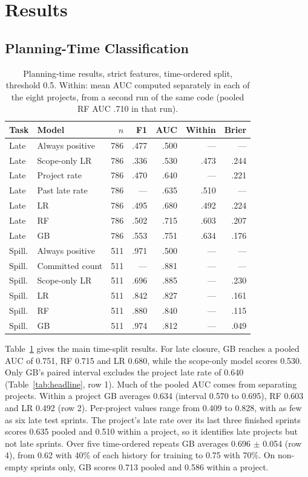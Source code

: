 \documentclass[conference]{IEEEtran}
\begin{document}
\section{Results}

\subsection{Planning-Time Classification}
\label{sec:plan}

\begin{table}[!t]
\centering\scriptsize
\caption{Planning-time results, strict features, time-ordered split, threshold 0.5. Within: mean AUC computed separately in each of the eight projects, from a second run of the same code (pooled RF AUC .710 in that run).}
\label{tab:main}
\setlength{\tabcolsep}{3pt}
\begin{tabular}{llrrrrr}
\hline
Task & Model & $n$ & F1 & AUC & Within & Brier\\
\hline
Late & Always positive & 786 & .477 & .500 & --- & ---\\
Late & Scope-only LR & 786 & .336 & .530 & .473 & .244\\
Late & Project rate & 786 & .470 & .640 & --- & .221\\
Late & Past late rate & 786 & --- & .635 & .510 & ---\\
Late & LR & 786 & .495 & .680 & .492 & .224\\
Late & RF & 786 & .502 & .715 & .603 & .207\\
Late & GB & 786 & .553 & .751 & .634 & .176\\
\hline
Spill. & Always positive & 511 & .971 & .500 & --- & ---\\
Spill. & Committed count & 511 & --- & .881 & --- & ---\\
Spill. & Scope-only LR & 511 & .696 & .885 & --- & .230\\
Spill. & LR & 511 & .842 & .827 & --- & .161\\
Spill. & RF & 511 & .880 & .840 & --- & .115\\
Spill. & GB & 511 & .974 & .812 & --- & .049\\
\hline
\end{tabular}
\end{table}

Table~\ref{tab:main} gives the main time-split results. For late closure, GB reaches a pooled AUC of 0.751, RF 0.715 and LR 0.680, while the scope-only model scores 0.530. Only GB's paired interval excludes the project late rate of 0.640 (Table~\ref{tab:headline}, row 1). Much of the pooled AUC comes from separating projects. Within a project GB averages 0.634 (interval 0.570 to 0.695), RF 0.603 and LR 0.492 (row 2). Per-project values range from 0.409 to 0.828, with as few as six late test sprints. The project's late rate over its last three finished sprints scores 0.635 pooled and 0.510 within a project, so it identifies late projects but not late sprints. Over five time-ordered repeats GB averages 0.696 $\pm$ 0.054 (row 4), from 0.62 with 40\% of each history for training to 0.75 with 70\%. On non-empty sprints only, GB scores 0.713 pooled and 0.586 within a project.
\end{document}
